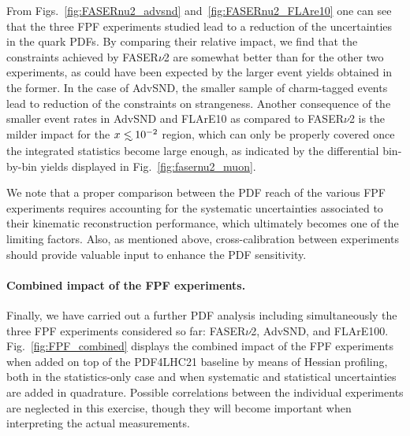 From Figs.~\ref{fig:FASERnu2_advsnd} and~\ref{fig:FASERnu2_FLAre10} one can see that the three
FPF experiments studied lead to a reduction of the  uncertainties in the quark PDFs.
%
By comparing their relative impact, we find that the constraints
achieved by FASER$\nu$2 are somewhat better than for the other two experiments,
as could have been expected by the larger event yields obtained in the former.
%
In the case of AdvSND, the  smaller sample of charm-tagged events lead to reduction
of the constraints on strangeness.
%
Another consequence of the smaller event rates in AdvSND and FLArE10 as compared
to FASER$\nu$2 is the milder impact for the $x\lsim 10^{-2}$ region,
which can only be properly covered once the integrated statistics become large
enough,  as indicated by the differential bin-by-bin yields displayed in Fig.~\ref{fig:fasernu2_muon}.


We note that a proper comparison between the PDF reach of
the various FPF experiments requires accounting for the systematic uncertainties
associated to their kinematic reconstruction performance, which ultimately becomes
one of the limiting factors.
%
Also, as mentioned above, cross-calibration between experiments should provide
valuable input to enhance the PDF sensitivity.

\paragraph{Combined impact of the FPF experiments.}
%
Finally, we have carried out a further PDF analysis including simultaneously the three FPF experiments
considered so far: FASER$\nu$2, AdvSND, and FLArE100.
%
Fig.~\ref{fig:FPF_combined} displays the combined impact of the FPF experiments when added
on top of the  PDF4LHC21 baseline by means of Hessian profiling, both in the statistics-only case and
when systematic and statistical uncertainties are added in quadrature.
%
Possible correlations between the individual experiments are neglected in this exercise, though they
will become important when interpreting the actual measurements.


